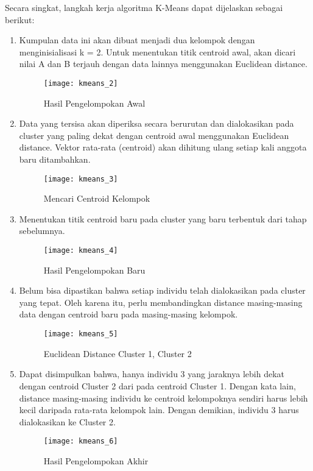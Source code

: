 \noindent Secara singkat, langkah kerja algoritma K-Means dapat dijelaskan sebagai berikut:
\begin{enumerate}

\item Kumpulan data ini akan dibuat menjadi dua kelompok dengan menginisialisasi k = 2. Untuk menentukan titik centroid awal, akan dicari nilai A dan B terjauh dengan data lainnya menggunakan Euclidean distance.

\begin{figure}[H]
	\centering
	\texttt{[image: kmeans\_2]}
	\caption{Hasil Pengelompokan Awal}
	\label{fig:kmeans_2}
\end{figure}

\item Data yang tersisa akan diperiksa secara berurutan dan dialokasikan pada cluster yang paling dekat dengan centroid awal menggunakan Euclidean distance. Vektor rata-rata (centroid) akan dihitung ulang setiap kali anggota baru ditambahkan.

\begin{figure}[H]
	\centering
	\texttt{[image: kmeans\_3]}
	\caption{Mencari Centroid Kelompok}
	\label{fig:kmeans_3}
\end{figure}

\item Menentukan titik centroid baru pada cluster yang baru terbentuk dari tahap sebelumnya.

\begin{figure}[H]
	\centering
	\texttt{[image: kmeans\_4]}
	\caption{Hasil Pengelompokan Baru}
	\label{fig:kmeans_4}
\end{figure}

\item Belum bisa dipastikan bahwa setiap individu telah dialokasikan pada cluster yang tepat. Oleh karena itu, perlu membandingkan distance masing-masing data dengan centroid baru pada masing-masing kelompok.

\begin{figure}[H]
	\centering
	\texttt{[image: kmeans\_5]}
	\caption{Euclidean Distance Cluster 1, Cluster 2}
	\label{fig:kmeans_5}
\end{figure}

\item Dapat disimpulkan bahwa, hanya individu 3 yang jaraknya lebih dekat dengan centroid Cluster 2 dari pada centroid Cluster 1. Dengan kata lain, distance masing-masing individu ke centroid kelompoknya sendiri harus lebih kecil daripada rata-rata kelompok lain. Dengan demikian, individu 3 harus dialokasikan ke Cluster 2.

\begin{figure}[H]
	\centering
	\texttt{[image: kmeans\_6]}
	\caption{Hasil Pengelompokan Akhir}
	\label{fig:kmeans_6}
\end{figure}



\end{enumerate}





